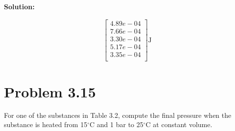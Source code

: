 \documentclass{article}
\newenvironment{solution}{\par\noindent\textbf{\\Solution:\\}}{\par\medskip}
\begin{document}
\begin{solution}
\begin{center}
{\begin{minipage}{0pt}
\begin{align*}
\begin{bmatrix}
                          4.89e-04 \\
                          7.66e-04 \\
                          3.30e-04 \\
                          5.17e-04 \\
                          3.35e-04 \\
                      \end{bmatrix}
                      \unit{ \joule }
                  \end{align*}
              \end{minipage}%
              \hspace{0pt}%
          }
      \end{center}
\end{solution}


\section*{Problem 3.15}
For one of the substances in Table 3.2, compute the final pressure when the substance is heated from 15$^\circ$C and 1 bar to 25$^\circ$C at constant volume.
\end{document}
